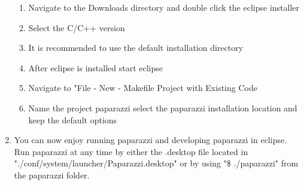 \documentclass{article}
\begin{document}
\begin{enumerate}
{\begin{enumerate}
\item{Navigate to the Downloads directory and double click the eclipse installer}
\item{Select the C/C++ version}
\item{It is recommended to use the default installation directory}
\item{After eclipse is installed start eclipse}
\item{Navigate to "File - New - Makefile Project with Existing Code}
\item{Name the project paparazzi select the paparazzi installation location and keep the default options}
\end{enumerate}
}
\item{You can now enjoy running paparazzi and developing paparazzi in eclipse. Run paparazzi at any time by either the .desktop file located in "./conf/system/launcher/Paparazzi.desktop" or by using "\$ ./paparazzi" from the paparazzi folder.}
\end{enumerate}
\end{document}
